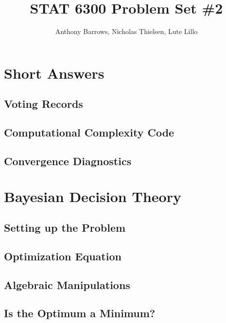 \documentclass[]{article}
\title{STAT 6300 Problem Set \#2}
\author{Anthony Barrows, Nicholas Thielsen, Lute Lillo}
\begin{document}
\maketitle


\section{Short Answers}

\subsection{Voting Records}


\subsection{Computational Complexity Code}


\subsection{Convergence Diagnostics}


\section{Bayesian Decision Theory}

\subsection{Setting up the Problem}


\subsection{Optimization Equation}


\subsection{Algebraic Manipulations}


\subsection{Is the Optimum a Minimum?}

\end{document}
